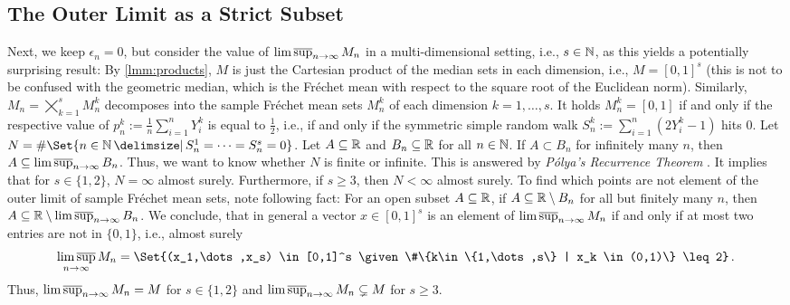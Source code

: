 \subsection{The Outer Limit as a Strict Subset}
Next, we keep $\epsilon_n=0$, but consider the value of $\operatorname*{lim\, \overline{sup}}_{n\to\infty} M_n$ in a multi-dimensional setting, i.e., $s\in\mathbb{N}$, as this yields a potentially surprising result:
By \autoref{lmm:products}, $M$ is just the Cartesian product of the median sets in each dimension, i.e., $M = [0,1]^s$ (this is not to be confused with the geometric median, which is the Fréchet mean with respect to the square root of the Euclidean norm). Similarly, $M_n = \bigtimes_{k=1}^s M_n^k$ decomposes into the sample Fréchet mean sets $M_n^k$ of each dimension $k=1,\dots,s$. It holds $M_n^k = [0,1]$ if and only if the respective value of $p_n^k := \frac1n \sum_{i=1}^n Y_i^k$ is equal to $\frac12$, i.e., if and only if the symmetric simple random walk $S_n^k := \sum_{i=1}^n (2Y_i^k-1)$ hits $0$. Let $N = \#\Set{n\in\N\given S_n^1=\dots=S_n^s=0}$. Let $A\subseteq \mathbb{R}$ and $B_n\subseteq \mathbb{R}$ for all $n\in\mathbb{N}$. If $A\subset B_n$ for infinitely many $n$, then $A \subseteq \operatorname*{lim\, \overline{sup}}_{n\to\infty} B_n$. Thus, we want to know whether $N$ is finite or infinite. This is answered by \textit{Pólya's Recurrence Theorem} \cite{polya21}. It implies that for $s \in \{1, 2\}$, $N = \infty$ almost surely. Furthermore, if $s\geq 3$, then $N < \infty$ almost surely.
To find which points are not element of the outer limit of sample Fréchet mean sets, note following fact: For an open subset $A\subseteq \mathbb{R}$, if $A \subseteq \mathbb{R} \setminus B_n$ for all but finitely many $n$, then $A \subseteq \mathbb{R} \setminus \operatorname*{lim\, \overline{sup}}_{n\to\infty} B_n$.
We conclude, that in general a vector $x \in [0,1]^s$ is an element of $\operatorname*{lim\, \overline{sup}}_{n\to\infty} M_n$ if and only if at most two entries are not in $\{0,1\}$, i.e., almost surely
\begin{equation*}
	\outerlim_{n\to\infty} M_n = \Set{(x_1,\dots,x_s) \in [0,1]^s \given \#\{k\in\{1,\dots,s\} | x_k \in (0,1)\} \leq 2}
	\eqfs
\end{equation*}
Thus, $\operatorname*{lim\, \overline{sup}}_{n\to\infty} M_n = M$ for $s\in\{1,2\}$ and $\operatorname*{lim\, \overline{sup}}_{n\to\infty} M_n \subsetneq M$ for $s \geq 3$.

